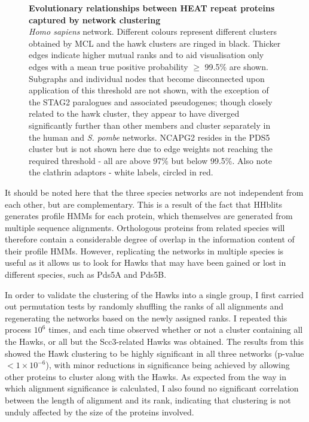 \documentclass[a4paper,11pt,twoside,openright]{scrbook}
\begin{document}
\begin{figure}[h]
    \caption[Evolutionary relationships between HEAT repeat proteins captured by network clustering]{\sffamily \textbf{Evolutionary relationships between HEAT repeat proteins captured by network clustering} \\ \small  \textit{Homo sapiens} network. Different colours represent different clusters obtained by MCL and the hawk clusters are ringed in black. Thicker edges indicate higher mutual ranks and to aid visualisation only edges with a mean true positive probability $\geq$ 99.5\% are shown. Subgraphs and individual nodes that become disconnected upon application of this threshold are not shown, with the exception of the STAG2 paralogues and associated pseudogenes; though closely related to the hawk cluster, they appear to have diverged significantly further than other members and cluster separately in the human and \textit{S. pombe} networks. NCAPG2 resides in the PDS5 cluster but is not shown here due to edge weights not reaching the required threshold - all are above 97\% but below 99.5\%. Also note the clathrin adaptors - white labels, circled in red.}
    \label{figure:clustering}
\end{figure}

It should be noted here that the three species networks are not independent from each other, but are complementary. This is a result of the fact that HHblits generates profile HMMs for each protein, which themselves are generated from multiple sequence alignments. Orthologous proteins from related species will therefore contain a considerable degree of overlap in the information content of their profile HMMs. However, replicating the networks in multiple species is useful as it allows us to look for Hawks that may have been gained or lost in different species, such as Pds5A and Pds5B.

In order to validate the clustering of the Hawks into a single group, I first carried out permutation tests by randomly shuffling the ranks of all alignments and regenerating the networks based on the newly assigned ranks. I repeated this process $10^{6}$ times, and each time observed whether or not a cluster containing all the Hawks, or all but the Scc3-related Hawks was obtained. The results from this showed the Hawk clustering to be highly significant in all three networks (p-value $< 1 \times 10^{-6}$), with minor reductions in significance being achieved by allowing other proteins to cluster along with the Hawks. As expected from the way in which alignment significance is calculated, I also found no significant correlation between the length of alignment and its rank, indicating that clustering is not unduly affected by the size of the proteins involved.
\end{document}
